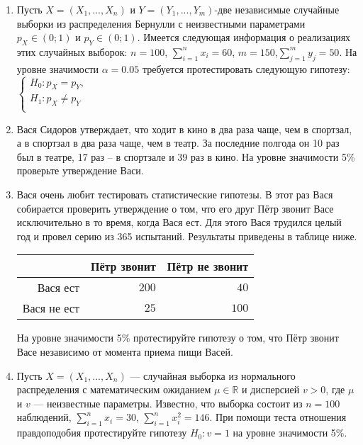 \documentclass[12pt]{article}
\begin{document}
\begin{enumerate}
\item Пусть $X = (X_{1},..., X_{n})$ и $Y = (Y_{1},..., Y_{m})$-две независимые случайные выборки из распределения Бернулли с неизвестными параметрами $p_{X} \in (0; 1)$ и $p_{Y} \in (0; 1)$. Имеется следующая информация о реализациях этих случайных выборок: $n = 100$, $\sum_{i=1}^{n} x_{i} = 60$, $m = 150$,$\sum_{j=1}^{m} y_{j} = 50$. На уровне значимости $\alpha = 0.05$ требуется протестировать следующую гипотезу: $\begin{cases}
H_{0}:p_{X} = p_{Y}, \\
H_{1}:p_{X} \neq p_{Y} \\
\end{cases}$

\item Вася Сидоров утверждает, что ходит в кино в два раза чаще, чем в спортзал, а в спортзал в два раза чаще, чем в театр. За последние полгода он 10 раз был в театре, 17 раз – в спортзале и 39 раз в кино. На уровне значимости 5\% проверьте утверждение Васи.

\item Вася очень любит тестировать статистические гипотезы. В этот раз Вася собирается проверить утверждение о том, что его друг Пётр звонит Васе исключительно в то время, когда Вася ест. Для этого Вася трудился целый год и провел серию из 365 испытаний. Результаты приведены в таблице ниже.
\begin{center}\begin{tabular}{r|rr}
\toprule
   & Пётр звонит   & Пётр не звонит  \\ \midrule
Вася ест           & $200$ & $40$ \\ 
 Вася не ест       & $25$ & $100$  \\ \bottomrule
\end{tabular}\end{center}
На уровне значимости 5\% протестируйте гипотезу о том, что Пётр звонит Васе
независимо от момента приема пищи Васей.

\item Пусть $X = (X_{1},..., X_{n})$ — случайная выборка из нормального распределения
с математическим ожиданием $\mu \in \mathbb{R}$ и дисперсией $v > 0$, где $\mu$ и $v$ — неизвестные параметры. Известно, что выборка состоит из $n = 100$ наблюдений, $\sum_{i=1}^{n} x_{i} = 30$, $\sum_{i=1}^{n} x^2_{i} = 146$. При помощи теста отношения правдоподобия протестируйте гипотезу $H_{0}:v = 1$ на уровне значимости 5\%.



\end{enumerate}
\end{document}
